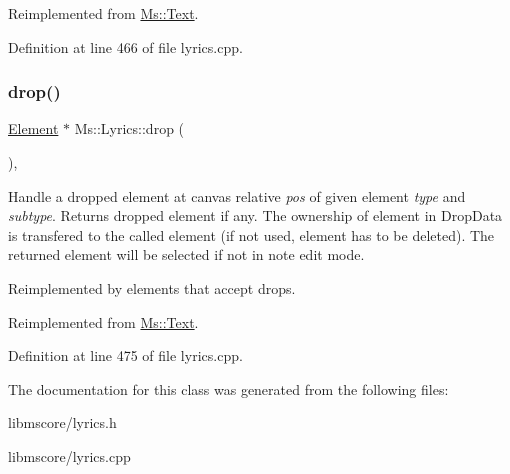 Reimplemented from \hyperlink{class_ms_1_1_text_ad2cd890960721f25a8d4721031fa45f8}{Ms\+::\+Text}.



Definition at line 466 of file lyrics.\+cpp.

\mbox{\label{class_ms_1_1_lyrics_acbb976663d84ab3abf82d0609574b26f}} 
\subsubsection{\texorpdfstring{drop()}{drop()}}
{\footnotesize\ttfamily \hyperlink{class_ms_1_1_element}{Element} $\ast$ Ms\+::\+Lyrics\+::drop (\begin{DoxyParamCaption}\item[{\hyperlink{class_ms_1_1_edit_data}{Edit\+Data} \&}]{ }\end{DoxyParamCaption})\hspace{0.3cm}{\ttfamily [override]}, {\ttfamily [virtual]}}

Handle a dropped element at canvas relative {\itshape pos} of given element {\itshape type} and {\itshape subtype}. Returns dropped element if any. The ownership of element in Drop\+Data is transfered to the called element (if not used, element has to be deleted). The returned element will be selected if not in note edit mode.

Reimplemented by elements that accept drops. 

Reimplemented from \hyperlink{class_ms_1_1_text_a410338a533177c7f52bbd691505211a0}{Ms\+::\+Text}.



Definition at line 475 of file lyrics.\+cpp.



The documentation for this class was generated from the following files\+:\begin{DoxyCompactItemize}
\item 
libmscore/lyrics.\+h\item 
libmscore/lyrics.\+cpp\end{DoxyCompactItemize}
